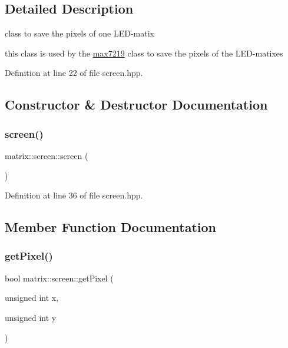 \subsection{Detailed Description}
class to save the pixels of one L\+E\+D-\/matix 

this class is used by the \mbox{\hyperlink{classmatrix_1_1max7219}{max7219}} class to save the pixels of the L\+E\+D-\/matixes 

Definition at line 22 of file screen.\+hpp.



\subsection{Constructor \& Destructor Documentation}
\mbox{\label{classmatrix_1_1screen_af07c83f7aa51a1f7f60abbdf3bd95986}} 
\subsubsection{\texorpdfstring{screen()}{screen()}}
{\footnotesize\ttfamily matrix\+::screen\+::screen (\begin{DoxyParamCaption}{ }\end{DoxyParamCaption})\hspace{0.3cm}{\ttfamily [inline]}}



Definition at line 36 of file screen.\+hpp.



\subsection{Member Function Documentation}
\mbox{\label{classmatrix_1_1screen_a79b2674573b2252b70eaf1f6448f58fd}} 
\subsubsection{\texorpdfstring{get\+Pixel()}{getPixel()}}
{\footnotesize\ttfamily bool matrix\+::screen\+::get\+Pixel (\begin{DoxyParamCaption}\item[{unsigned int}]{x,  }\item[{unsigned int}]{y }\end{DoxyParamCaption})}



